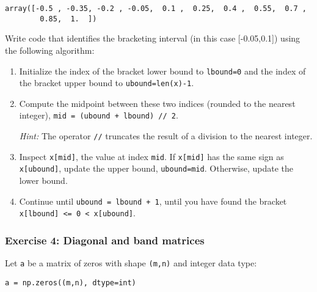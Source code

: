 \documentclass[10pt]{scrartcl}
\makeatletter
\newcommand{\boxspacing}{\kern\kvtcb@left@rule\kern\kvtcb@boxsep}
\newcommand{\prompt}[4]{
        {\ttfamily\llap{{\color{#2}[#3]:\hspace{3pt}#4}}\vspace{-\baselineskip}}
    }
\makeatother
\begin{document}
            \begin{tcolorbox}[breakable, size=fbox, boxrule=.5pt, pad at break*=1mm, opacityfill=0]
\prompt{Out}{outcolor}{34}{\boxspacing}
\begin{Verbatim}[commandchars=\\\{\}]
array([-0.5 , -0.35, -0.2 , -0.05,  0.1 ,  0.25,  0.4 ,  0.55,  0.7 ,
        0.85,  1.  ])
\end{Verbatim}
\end{tcolorbox}
        
    Write code that identifies the bracketing interval (in this case
{[}-0.05,0.1{]}) using the following algorithm:

\begin{enumerate}
\def\labelenumi{\arabic{enumi}.}
\item
  Initialize the index of the bracket lower bound to \texttt{lbound=0}
  and the index of the bracket upper bound to \texttt{ubound=len(x)-1}.
\item
  Compute the midpoint between these two indices (rounded to the nearest
  integer), \texttt{mid\ =\ (ubound\ +\ lbound)\ //\ 2}.

  \emph{Hint:} The operator \texttt{//} truncates the result of a
  division to the nearest integer.
\item
  Inspect \texttt{x{[}mid{]}}, the value at index \texttt{mid}. If
  \texttt{x{[}mid{]}} has the same sign as \texttt{x{[}ubound{]}},
  update the upper bound, \texttt{ubound=mid}. Otherwise, update the
  lower bound.
\item
  Continue until \texttt{ubound\ =\ lbound\ +\ 1}, \ie until you have
  found the bracket
  \texttt{x{[}lbound{]}\ \textless{}=\ 0\ \textless{}\ x{[}ubound{]}}.
\end{enumerate}

    \hypertarget{exercise-4-diagonal-and-band-matrices}{%
\subsubsection{Exercise 4: Diagonal and band
matrices}\label{exercise-4-diagonal-and-band-matrices}}

Let \texttt{a} be a matrix of zeros with shape \texttt{(m,n)} and
integer data type:

\begin{verbatim}
a = np.zeros((m,n), dtype=int)
\end{verbatim}
\end{document}

